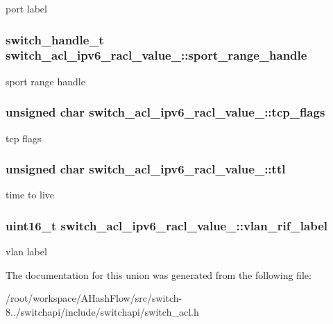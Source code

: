 port label \hypertarget{unionswitch__acl__ipv6__racl__value___a7c2c1b519b8d294255df4fdb0f669830}{
\subsubsection[{sport\+\_\+range\+\_\+handle}]{\setlength{\rightskip}{0pt plus 5cm}switch\+\_\+handle\+\_\+t switch\+\_\+acl\+\_\+ipv6\+\_\+racl\+\_\+value\+\_\+\+::sport\+\_\+range\+\_\+handle}}\label{unionswitch__acl__ipv6__racl__value___a7c2c1b519b8d294255df4fdb0f669830}
sport range handle \hypertarget{unionswitch__acl__ipv6__racl__value___a544c225ca157a35bea87bde9448b0b5a}{
\subsubsection[{tcp\+\_\+flags}]{\setlength{\rightskip}{0pt plus 5cm}unsigned char switch\+\_\+acl\+\_\+ipv6\+\_\+racl\+\_\+value\+\_\+\+::tcp\+\_\+flags}}\label{unionswitch__acl__ipv6__racl__value___a544c225ca157a35bea87bde9448b0b5a}
tcp flags \hypertarget{unionswitch__acl__ipv6__racl__value___aa998e01c56d4a83f168b3cce8aa390a7}{
\subsubsection[{ttl}]{\setlength{\rightskip}{0pt plus 5cm}unsigned char switch\+\_\+acl\+\_\+ipv6\+\_\+racl\+\_\+value\+\_\+\+::ttl}}\label{unionswitch__acl__ipv6__racl__value___aa998e01c56d4a83f168b3cce8aa390a7}
time to live \hypertarget{unionswitch__acl__ipv6__racl__value___af300c50a29cb1f6ddcce5d703914cfee}{
\subsubsection[{vlan\+\_\+rif\+\_\+label}]{\setlength{\rightskip}{0pt plus 5cm}uint16\+\_\+t switch\+\_\+acl\+\_\+ipv6\+\_\+racl\+\_\+value\+\_\+\+::vlan\+\_\+rif\+\_\+label}}\label{unionswitch__acl__ipv6__racl__value___af300c50a29cb1f6ddcce5d703914cfee}
vlan label 

The documentation for this union was generated from the following file\+:\begin{DoxyCompactItemize}
\item 
/root/workspace/\+A\+Hash\+Flow/src/switch-\/8../switchapi/include/switchapi/switch\+\_\+acl.\+h\end{DoxyCompactItemize}
